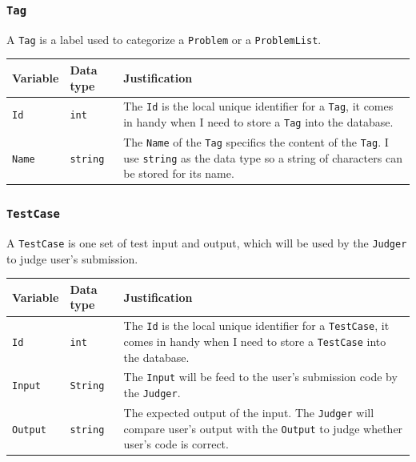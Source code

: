 \documentclass[a4paper]{report}
\begin{document}
\subsubsection{\texttt{Tag}}

A \texttt{Tag} is a label used to categorize a \texttt{Problem} or a \texttt{ProblemList}.

\begin{tabulary}{\textwidth}{|l|l|L|}
      \hline
      Variable & Data type & Justification \\
      \hline
      \texttt{Id} & \texttt{int} & The \texttt{Id} is the local unique identifier for a \texttt{Tag}, it comes in handy when I need to store a \texttt{Tag} into the database. \\
      \hline
      \texttt{Name} & \texttt{string} & The \texttt{Name} of the \texttt{Tag} specifics the content of the \texttt{Tag}. I use \texttt{string} as the data type so a string of characters can be stored for its name. \\
      \hline
\end{tabulary}

\subsubsection{\texttt{TestCase}}

A \texttt{TestCase} is one set of test input and output, which will be used by the \texttt{Judger} to judge user's submission.

\begin{tabulary}{\textwidth}{|l|l|L|}
      \hline
      Variable & Data type & Justification \\
      \hline
      \texttt{Id} & \texttt{int} & The \texttt{Id} is the local unique identifier for a \texttt{TestCase}, it comes in handy when I need to store a \texttt{TestCase} into the database. \\
      \hline
      \texttt{Input} & \texttt{String} & The \texttt{Input} will be feed to the user's submission code by the \texttt{Judger}. \\
      \hline
      \texttt{Output} & \texttt{string} & The expected output of the input. The \texttt{Judger} will compare user's output with the \texttt{Output} to judge whether user's code is correct. \\
      \hline
\end{tabulary}
\end{document}
